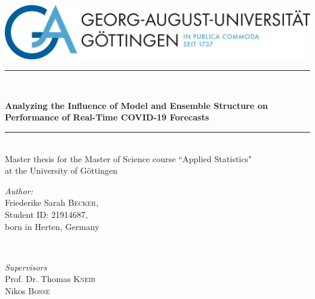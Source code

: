 \begin{titlepage}
\thispagestyle{empty}
\newcommand{\HRule}{\rule{\linewidth}{0.6mm}} %

\center %


\includegraphics[scale = 0.55]{unilogo.png}\\[1cm]

\vspace{1.5cm}
\HRule \\[0.4cm]
\begin{spacing}{1.5}
{ \LARGE \bfseries Analyzing the Influence of Model and Ensemble Structure on Performance of Real-Time COVID-19 Forecasts}\\%
\end{spacing}
\HRule \\[2.5cm]

\large{Master thesis for the Master of Science course ``Applied Statistics" \\ at the University of Göttingen \\[2cm]} %


\begin{minipage}{0.35\textwidth}
\begin{flushleft} \large
\emph{Author:}\\
Friederike Sarah \textsc{Becker},\\
Student ID: 21914687, \\
born in Herten, Germany
\end{flushleft}
\end{minipage}
~
\begin{minipage}{0.45\textwidth}
\begin{flushright} \large
\emph{Supervisors} \\
Prof. Dr. Thomas \textsc{Kneib}\\
Nikos \textsc{Bosse} \\
\end{flushright}
\end{minipage}\\[3cm]


\end{titlepage}
